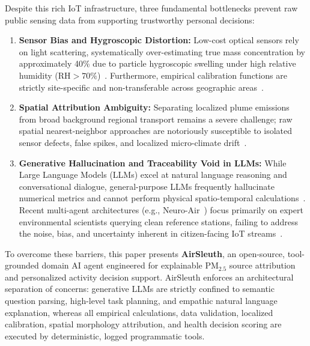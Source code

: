 \documentclass[conference]{IEEEtran}
\begin{document}
Despite this rich IoT infrastructure, three fundamental bottlenecks prevent raw public sensing data from supporting trustworthy personal decisions:
\begin{enumerate}
    \item \textbf{Sensor Bias and Hygroscopic Distortion:} Low-cost optical sensors rely on light scattering, systematically over-estimating true mass concentration by approximately 40\% due to particle hygroscopic swelling under high relative humidity ($\text{RH} > 70\%$)~\cite{s_008, s_009}. Furthermore, empirical calibration functions are strictly site-specific and non-transferable across geographic areas~\cite{s_010, s_058}.
    \item \textbf{Spatial Attribution Ambiguity:} Separating localized plume emissions from broad background regional transport remains a severe challenge; raw spatial nearest-neighbor approaches are notoriously susceptible to isolated sensor defects, false spikes, and localized micro-climate drift~\cite{s_057}.
    \item \textbf{Generative Hallucination and Traceability Void in LLMs:} While Large Language Models (LLMs) excel at natural language reasoning and conversational dialogue, general-purpose LLMs frequently hallucinate numerical metrics and cannot perform physical spatio-temporal calculations~\cite{s_035}. Recent multi-agent architectures (e.g., Neuro-Air~\cite{s_053}) focus primarily on expert environmental scientists querying clean reference stations, failing to address the noise, bias, and uncertainty inherent in citizen-facing IoT streams~\cite{s_055}.
\end{enumerate}

To overcome these barriers, this paper presents \textbf{AirSleuth}, an open-source, tool-grounded domain AI agent engineered for explainable $\text{PM}_{2.5}$ source attribution and personalized activity decision support. AirSleuth enforces an architectural separation of concerns: generative LLMs are strictly confined to semantic question parsing, high-level task planning, and empathic natural language explanation, whereas all empirical calculations, data validation, localized calibration, spatial morphology attribution, and health decision scoring are executed by deterministic, logged programmatic tools.
\end{document}
